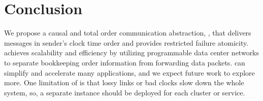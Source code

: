 \section{Conclusion}
\label{sec:conclusion}

We propose a causal and total order communication abstraction, \sys{}, that delivers messages in sender's clock time order and provides restricted failure atomicity. 
\sys{} achieves scalability and efficiency by utilizing programmable data center networks to separate bookkeeping order information from forwarding data packets.
\sys{} can simplify and accelerate many applications, and we expect future work to explore more. %
One limitation of \sys{} is that lossy links or bad clocks slow down the whole system, so, a separate \sys{} instance should be deployed for each cluster or service.
